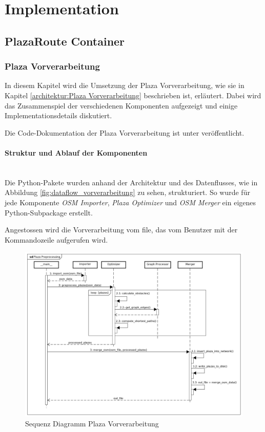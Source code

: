 
\section{Implementation}
\label{sec:Implementation}

\subsection{PlazaRoute Container}
\label{impl:PlazaRoute Container}


\subsubsection{Plaza Vorverarbeitung}
\label{impl:Plaza Vorverarbeitung}

In diesem Kapitel wird die Umsetzung der Plaza Vorverarbeitung, wie sie in Kapitel \ref{architektur:Plaza Vorverarbeitung} beschrieben ist, erläutert. Dabei wird das Zusammenspiel der verschiedenen Komponenten aufgezeigt und einige Implementationsdetails diskutiert.

Die Code-Dokumentation der Plaza Vorverarbeitung ist unter \cite{PlazaRoute-apidoc} veröffentlicht.

\paragraph{Struktur und Ablauf der Komponenten} \label{impl:Struktur der Komponenten} ~\\
Die Python-Pakete wurden anhand der Architektur und des Datenflusses, wie in Abbildung \ref{fig:dataflow_vorverarbeitung} zu sehen, strukturiert. So wurde für jede Komponente \emph{OSM Importer}, \emph{Plaza Optimizer} und \emph{OSM Merger} ein eigenes Python-Subpackage erstellt.

Angestossen wird die Vorverarbeitung vom  file, das vom Benutzer mit der Kommandozeile aufgerufen wird.

\begin{figure}[ht]
    \centering
    \includegraphics[width=1\linewidth]{projectdoc/img/sequence_diagram_plaza_preprocessing.png}
    \caption[Sequenz Diagramm Plaza Vorverarbeitung]{Sequenz Diagramm Plaza Vorverarbeitung}
    \label{fig:sequence_diagram_plaza_preprocessing}
\end{figure}


